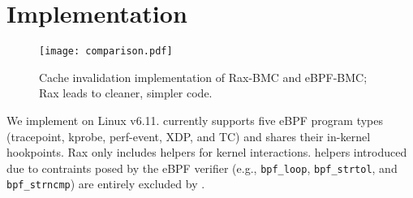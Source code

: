 \vspace{-8pt}
\section{Implementation}
\label{sec:impl}
\vspace{-5pt}

\begin{figure*}[t]
    \texttt{[image: comparison.pdf]}
    \centering
    \vspace{-15pt}
    \caption{Cache invalidation implementation of Rax-BMC and eBPF-BMC; Rax leads to cleaner, simpler code.}
    \vspace{-5pt}
    \label{fig:rust-code}
\end{figure*}

We implement \projname{} on Linux v6.11.
\projname{} currently supports five eBPF program types (tracepoint, kprobe,
    perf-event, XDP, and TC) and shares their in-kernel hookpoints.
Rax only includes helpers for kernel interactions.
helpers introduced due to
    contraints posed by the eBPF verifier
    (e.g., \texttt{\small bpf\_loop}, \texttt{\small bpf\_strtol}, and
    \texttt{\small bpf\_strncmp}) are entirely excluded by \projname{}.

